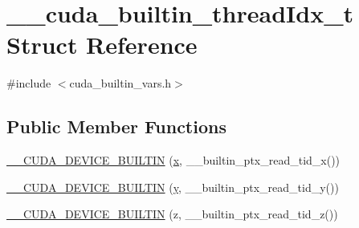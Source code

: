 \hypertarget{struct____cuda__builtin__threadIdx__t}{\section{\-\_\-\-\_\-cuda\-\_\-builtin\-\_\-thread\-Idx\-\_\-t Struct Reference}
\label{struct____cuda__builtin__threadIdx__t}
}


{\ttfamily \#include $<$cuda\-\_\-builtin\-\_\-vars.\-h$>$}

\subsection*{Public Member Functions}
\begin{DoxyCompactItemize}
\item 
\hyperlink{struct____cuda__builtin__threadIdx__t_ac8e081ae3edb5931021b50d6390d1fa8}{\-\_\-\-\_\-\-C\-U\-D\-A\-\_\-\-D\-E\-V\-I\-C\-E\-\_\-\-B\-U\-I\-L\-T\-I\-N} (\hyperlink{OWGeneric__SensorStation_8ino_ad0da36b2558901e21e7a30f6c227a45e}{x}, \-\_\-\-\_\-builtin\-\_\-ptx\-\_\-read\-\_\-tid\-\_\-x())
\item 
\hyperlink{struct____cuda__builtin__threadIdx__t_aef792d9cd2743ed2fd1a554c1275b195}{\-\_\-\-\_\-\-C\-U\-D\-A\-\_\-\-D\-E\-V\-I\-C\-E\-\_\-\-B\-U\-I\-L\-T\-I\-N} (\hyperlink{OWGeneric__SensorStation_8ino_aa4f0d3eebc3c443f9be81bf48561a217}{y}, \-\_\-\-\_\-builtin\-\_\-ptx\-\_\-read\-\_\-tid\-\_\-y())
\item 
\hyperlink{struct____cuda__builtin__threadIdx__t_a920ea45245d27c03c990738911781373}{\-\_\-\-\_\-\-C\-U\-D\-A\-\_\-\-D\-E\-V\-I\-C\-E\-\_\-\-B\-U\-I\-L\-T\-I\-N} (z, \-\_\-\-\_\-builtin\-\_\-ptx\-\_\-read\-\_\-tid\-\_\-z())
\end{DoxyCompactItemize}


